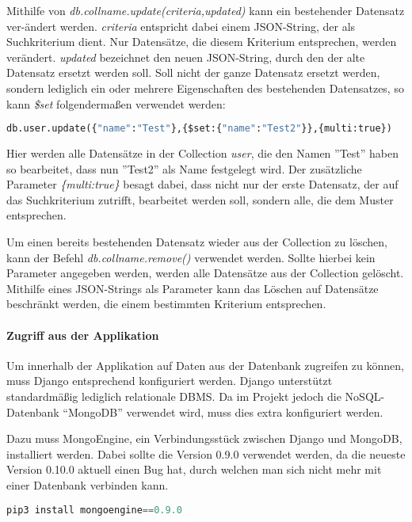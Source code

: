\newpage

Mithilfe von \textit{db.collname.update(criteria,updated)} kann ein bestehender Datensatz ver-ändert werden. \textit{criteria} entspricht dabei einem JSON-String, der als Suchkriterium dient. Nur Datensätze, die diesem Kriterium entsprechen, werden verändert. \textit{updated} bezeichnet den neuen JSON-String, durch den der alte Datensatz ersetzt werden soll. Soll nicht der ganze Datensatz ersetzt werden, sondern lediglich ein oder mehrere Eigenschaften des bestehenden Datensatzes, so kann \textit{\$set} folgendermaßen verwendet werden:\\
\begin{lstlisting}[caption=Bearbeiten eines bestehenden Datensatzes, language=Python]
db.user.update({"name":"Test"},{$set:{"name":"Test2"}},{multi:true})
\end{lstlisting}
Hier werden alle Datensätze in der Collection \textit{user}, die den Namen ''Test'' haben so bearbeitet, dass nun ''Test2'' als Name festgelegt wird. Der zusätzliche Parameter \textit{\{multi:true\}} besagt dabei, dass nicht nur der erste Datensatz, der auf das Suchkriterium zutrifft, bearbeitet werden soll, sondern alle, die dem Muster entsprechen.

Um einen bereits bestehenden Datensatz wieder aus der Collection zu löschen, kann der Befehl \textit{db.collname.remove()} verwendet werden. Sollte hierbei kein Parameter angegeben werden, werden alle Datensätze aus der Collection gelöscht. Mithilfe eines JSON-Strings als Parameter kann das Löschen auf Datensätze beschränkt werden, die einem bestimmten Kriterium entsprechen.

\paragraph{Zugriff aus der Applikation}
Um innerhalb der Applikation auf Daten aus der Datenbank zugreifen zu können, muss Django entsprechend konfiguriert werden. Django unterstützt standardmäßig lediglich relationale DBMS. Da im Projekt jedoch die NoSQL-Datenbank “MongoDB” verwendet wird, muss dies extra konfiguriert werden.

Dazu muss MongoEngine, ein Verbindungsstück zwischen Django und MongoDB, installiert werden. Dabei sollte die Version 0.9.0 verwendet werden, da die neueste Version 0.10.0 aktuell einen Bug hat, durch welchen man sich nicht mehr mit einer Datenbank verbinden kann.\\
\begin{lstlisting}[caption=Installation von MongoEngine, language=Python]
pip3 install mongoengine==0.9.0
\end{lstlisting}


